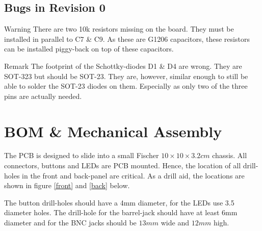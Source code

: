 \documentclass[10pt, a4paper,twoside]{scrartcl}
\newenvironment{remark}{\begin{bclogo}[couleur=blue!30,arrondi=.1,logo=\bcinfo,ombre=true]{Remark}}{\end{bclogo}}
\newenvironment{warning}{\begin{bclogo}[couleur=red!30,arrondi=.1,logo=\bcattention,ombre=true]{Warning}}{\end{bclogo}}
\begin{document}
\subsection{Bugs in Revision 0}
\begin{warning}
 There are two 10k resistors missing on the board. They must be installed in parallel to C7 \& C9. As these are G1206 capacitors, these resistors can be installed piggy-back on top of these capacitors.
\end{warning}

\begin{remark}
 The footprint of the Schottky-diodes D1 \& D4 are wrong. They are SOT-323 but should be SOT-23. They are, however, similar enough to still be able to solder the SOT-23 diodes on them. Especially as only two of the three pins are actually needed.
\end{remark}


\section{BOM \& Mechanical Assembly}
The PCB is designed to slide into a small Fischer $10 \times 10 \times 3.2cm$ chassis. All connectors, buttons and LEDs are PCB mounted. Hence, the location of all drill-holes in the front and back-panel are critical. As a drill aid, the locations are shown in figure \ref{front} and \ref{back} below.

The button drill-holes should have a 4mm diameter, for the LEDs use 3.5 diameter holes. The drill-hole for the barrel-jack should have at least 6mm diameter and for the BNC jacks should be $13 mm$ wide and $12mm$ high.  

\clearpage
\end{document}

